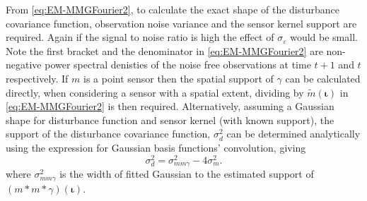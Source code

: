 \documentclass[]{article}
\begin{document}
From \eqref{eq:EM-MMGFourier2}, to calculate the exact shape of the disturbance covariance function, observation noise variance and the sensor kernel support are required. Again if the signal to noise ratio is high the effect of $\sigma_{\varepsilon}$ would be small. Note the first bracket and the denominator in \eqref{eq:EM-MMGFourier2} are non-negative power spectral denisties of the noise free observations at time $t+1$ and $t$ respectively. If $m$ is a point sensor then the spatial support of $\gamma$ can be calculated directly, when considering a sensor with a spatial extent, dividing by $\tilde{m}(\boldsymbol\iota)$ in \eqref{eq:EM-MMGFourier2} is then required. Alternatively, assuming a Gaussian shape for disturbance function and sensor kernel (with known support), the support of the disturbance covariance function, $\sigma^2_d$ can be determined analytically using the expression for Gaussian basis functions' convolution, giving 
\begin{equation}
 \sigma_d^2=\sigma_{mm\gamma}^2-4\sigma_m^2.
\end{equation}
where $\sigma_{mm\gamma}^2$ is the width of fitted Gaussian to the estimated support of $(m\ast m\ast\gamma)(\boldsymbol\iota)$.
\end{document}
